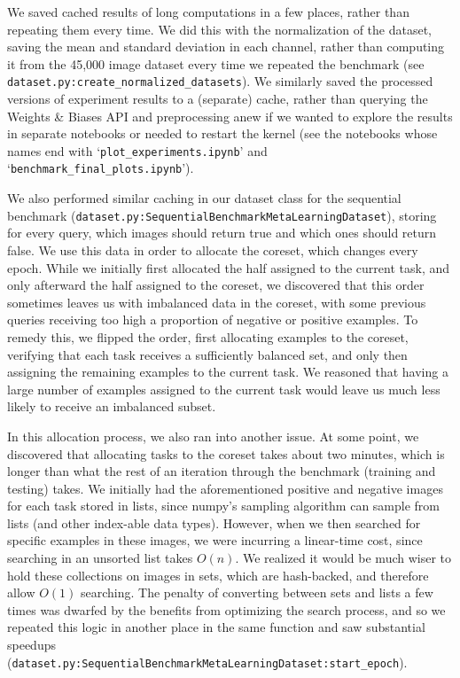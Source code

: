 We saved cached results of long computations in a few places, rather than repeating them every time. We did this with the normalization of the dataset, saving the mean and standard deviation in each channel, rather than computing it from the 45,000 image dataset every time we repeated the benchmark (see \texttt{dataset.py:create\_normalized\_datasets}). We similarly saved the processed versions of experiment results to a (separate) cache, rather than querying the Weights \& Biases API and preprocessing anew if we wanted to explore the results in separate notebooks or needed to restart the kernel (see the notebooks whose names end with `\texttt{plot\_experiments.ipynb}' and `\texttt{benchmark\_final\_plots.ipynb}').

We also performed similar caching in our dataset class for the sequential benchmark (\texttt{dataset.py:SequentialBenchmarkMetaLearningDataset}), storing for every query, which images should return true and which ones should return false. We use this data in order to allocate the coreset, which changes every epoch. While we initially first allocated the half assigned to the current task, and only afterward the half assigned to the coreset, we discovered that this order sometimes leaves us with imbalanced data in the coreset, with some previous queries receiving too high a proportion of negative or positive examples. To remedy this, we flipped the order, first allocating examples to the coreset, verifying that each task receives a sufficiently balanced set, and only then assigning the remaining examples to the current task. We reasoned that having a large number of examples assigned to the current task would leave us much less likely to receive an imbalanced subset. 

In this allocation process, we also ran into another issue. At some point, we discovered that allocating tasks to the coreset takes about two minutes, which is longer than what the rest of an iteration through the benchmark (training and testing) takes. We initially had the aforementioned positive and negative images for each task stored in lists, since numpy's sampling algorithm can sample from lists (and other index-able data types). However, when we then searched for specific examples in these images, we were incurring a linear-time cost, since searching in an unsorted list takes $O(n)$. We realized it would be much wiser to hold these collections on images in sets, which are hash-backed, and therefore allow $O(1)$ searching. The penalty of converting between sets and lists a few times was dwarfed by the benefits from optimizing the search process, and so we repeated this logic in another place in the same function and saw substantial speedups (\texttt{dataset.py:SequentialBenchmarkMetaLearningDataset:start\_epoch}). 

